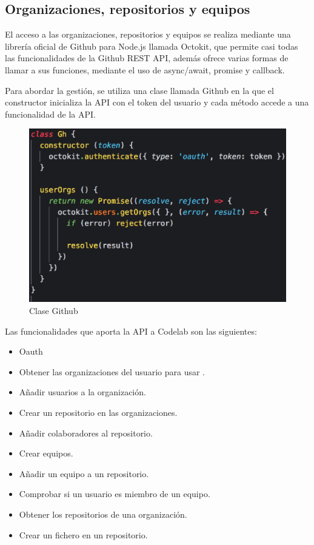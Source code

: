 \subsection{Organizaciones, repositorios y equipos}
\label{3:2:2}

El acceso a las organizaciones, repositorios y equipos se realiza mediante una librería oficial de Github para Node.js
llamada Octokit, que permite casi todas las funcionalidades de la Github REST API, además ofrece varias formas de llamar a sus funciones, mediante 
el uso de async/await, promise y callback.

Para abordar la gestión, se utiliza una clase llamada Github en la que el constructor inicializa la API con el token del usuario y cada método accede a una funcionalidad de la API.

\begin{figure}[!th]
\begin{center}
\includegraphics[scale=0.5]{images/clasegh}
\caption{Clase Github}
\label{fig:Clase Github}
\end{center}
\end{figure}

Las funcionalidades que aporta la API a Codelab son las siguientes:

\begin{itemize}
  \item Oauth
  \item Obtener las organizaciones del usuario para usar .
  \item Añadir usuarios a la organización.
  \item Crear un repositorio en las organizaciones.
  \item Añadir colaboradores al repositorio.
  \item Crear equipos.
  \item Añadir un equipo a un repositorio.
  \item Comprobar si un usuario es miembro de un equipo.
  \item Obtener los repositorios de una organización.
  \item Crear un fichero en un repositorio.
\end{itemize}

